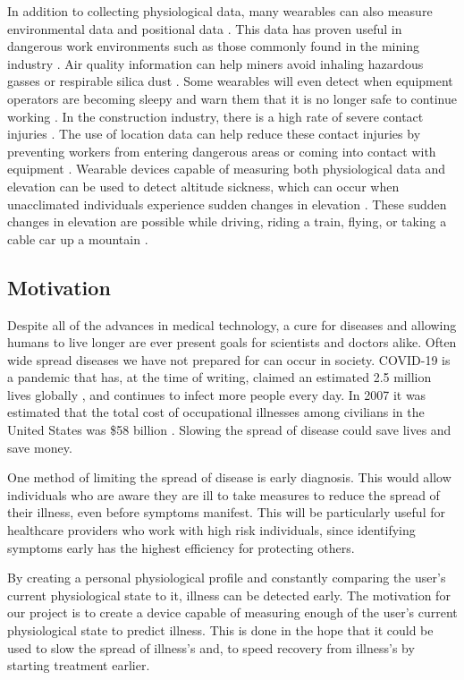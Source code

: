 In addition to collecting physiological data, many wearables can also measure
environmental data and positional data \cite{Seneviratne2017}. This data has 
proven useful in dangerous work environments such as those commonly 
found in the mining industry \cite{Mardonova2018}. Air quality information can
help miners avoid inhaling hazardous gasses or respirable silica dust 
\cite{Mardonova2018}. Some wearables will even detect when equipment operators
are becoming sleepy and warn them that it is no longer safe to continue working
\cite{Mardonova2018}. In the construction industry, there is a high rate of 
severe contact injuries \cite{Awolusi2018}. The use of location data can help 
reduce these contact injuries by preventing workers from entering dangerous 
areas or coming into contact with equipment \cite{Awolusi2018}. Wearable devices
capable of measuring both physiological data and elevation can be used to detect
altitude sickness, which can occur when unacclimated individuals experience sudden 
changes in elevation \cite{Muza2018}. These sudden changes in elevation are 
possible while driving, riding a train, flying, or taking a cable car up a mountain 
\cite{Muza2018}.

\subsection{Motivation}

Despite all of the advances in medical technology, a cure for diseases and
allowing humans to live longer are ever present goals for scientists and 
doctors alike.  Often wide spread diseases we have not prepared for can occur in
society.  COVID-19 is a pandemic that
has, at the time of writing, claimed an estimated 2.5 million lives globally
\cite{johns-hopkins-corona-chan}, and continues to infect more people every
day.  In 2007 it was estimated that the total cost of occupational illnesses
among civilians in the United States was \$58 billion \cite{Leigh2011}.
Slowing the spread of disease could save lives and save money.

One method of limiting the spread of disease is early diagnosis.  This would
allow individuals who are aware they are ill to take measures to reduce the
spread of their illness, even before symptoms manifest.  This will be
particularly useful for healthcare providers who work with high risk
individuals, since identifying symptoms early has the highest efficiency for
protecting others.

By creating a personal physiological profile and constantly
comparing the user's current physiological state to it, illness can be detected
early.  The motivation for our project is to create a device capable of measuring 
enough of the user's current physiological state to predict illness.  This is done 
in the hope that it could be used to slow the spread of illness's and, to speed
recovery from illness's by starting treatment earlier.

